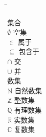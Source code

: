 \begin{notation}

\begin{tabbing}

  \hspace*{8em}\=\kill

  \textsf{集合} \\
  $\emptyset$  \> 空集 \\
  $\in$        \> 属于 \\
  $\subseteq$  \> 包含于 \\
  $\cap$       \> 交 \\
  $\cup$       \> 并 \\[\baselineskip]

  \textsf{数集} \\
  $\mathbb{N}$ \> 自然数集 \\
  $\mathbb{Z}$ \> 整数集 \\
  $\mathbb{Q}$ \> 有理数集 \\
  $\mathbb{R}$ \> 实数集 \\
  $\mathbb{C}$ \> 复数集 \\

\end{tabbing}

\end{notation}